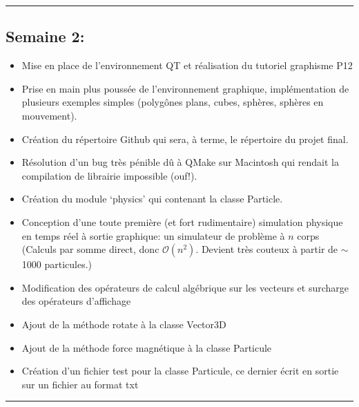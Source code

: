 \documentclass[12pt, letterpaper, twoside]{article}
\begin{document}
\rule{\textwidth}{0.4pt}

\subsection{Semaine 2:}
\begin{itemize}
\item Mise en place de l'environnement QT et réalisation du tutoriel graphisme P12 

\item Prise en main plus poussée de l'environnement graphique, implémentation de plusieurs exemples simples (polygônes plans, cubes, sphères, sphères en mouvement).

\item Création du répertoire Github qui sera, à terme, le répertoire du projet final.

\item Résolution d'un bug très pénible dû à QMake sur Macintosh qui rendait la compilation de librairie impossible (ouf!).

\item Création du module `physics' qui contenant la classe Particle.

\item Conception d'une toute première (et fort rudimentaire) simulation physique en temps réel à sortie graphique: un simulateur de problème à $n$ corps (Calculs par somme direct, donc $\mathcal{O}(n^2)$. Devient très couteux à partir de $\sim$1000 particules.)

\item Modification des opérateurs de calcul algébrique sur les vecteurs et surcharge des opérateurs d'affichage

\item Ajout de la méthode rotate à la classe Vector3D
\item Ajout de la méthode force magnétique à la classe Particule
\item Création d'un fichier test pour la classe Particule, ce dernier écrit en sortie sur un fichier au format txt
\end{itemize}

\rule{\textwidth}{0.4pt}
\end{document}
